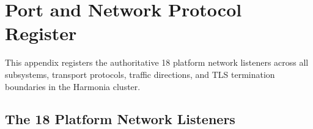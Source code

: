 
\chapter{Port and Network Protocol Register}
\label{app:port_register}

This appendix registers the authoritative 18 platform network listeners across all subsystems, transport protocols, traffic directions, and TLS termination boundaries in the Harmonia cluster.

\section{The 18 Platform Network Listeners}

